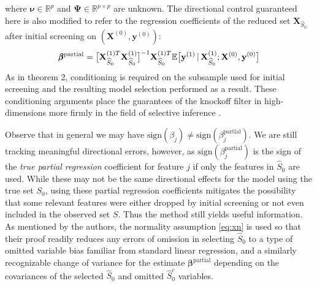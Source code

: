 \documentclass[]{scrartcl}
\newcommand{\1}[1]{\mathbbm{1}_{\left\{#1\right\}}}
\begin{document}
\begin{itemize}
	where $\pmb{\nu} \in \mathbb{R}^{p}$ and $\pmb{\Psi} \in \mathbb{R}^{p \times p}$ are unknown. The directional control guaranteed here is also modified to refer to the {} regression coefficients of the reduced set $\mathbf{\mathbf{X}}_{\widehat{S}_{0}}$ {} after initial screening on $(\mathbf{X}^{(0)}, \mathbf{y}^{(0)})$:
	\begin{align}
		\pmb{\beta}^{\text{\scriptsize{partial}}} = \big[\mathbf{X}_{\widehat{S}_{0}}^{(1)T}\mathbf{X}_{\widehat{S}_{0}}^{(1)} \big]^{-1}\mathbf{X}_{\widehat{S}_{0}}^{(1)T}\mathbb{E}\big[\mathbf{y}^{(1)}\,|\,\mathbf{X}_{\widehat{S}_{0}}^{(1)}; \mathbf{X}^{(0)}, \mathbf{y}^{(0)} \big]
	\end{align}
	As in theorem 2, conditioning is required on the subsample used for initial screening and the resulting model selection performed as a result. These conditioning arguments place the guarantees of the knockoff filter in high-dimensions more firmly in the field of selective inference \cite{slv}.
	
	\noindent
	Observe that in general we may have $\text{sign}(\beta_{j}) \neq \text{sign}(\beta_{j}^{\text{partial}})$. We are still tracking meaningful directional errors, however, as $\text{sign}(\beta_{j}^{\text{partial}})$ is the sign of the \textit{true partial regression} coefficient for feature $j$ if only the features in $\widehat{S}_{0}$ are used. While these may not be the same directional effects for the model using the true set $S_{0}$, using these partial regression coefficients mitigates the possibility that some relevant features were either dropped by initial screening or not even included in the observed set $S$. Thus the method still yields useful information. As mentioned by the authors, the normality assumption \eqref{eq:xn} is used so that their proof readily reduces any errors of omission in selecting $\widehat{S}_{0}$ to a type of omitted variable bias familiar from standard linear regression, and a similarly recognizable change of variance for the estimate $\pmb{\beta}^{\text{partial}}$ depending on the covariances of the selected $\widehat{S}_{0}$ and omitted $\widehat{S}_{0}^{c}$ variables. 
\end{itemize}
\end{document}
